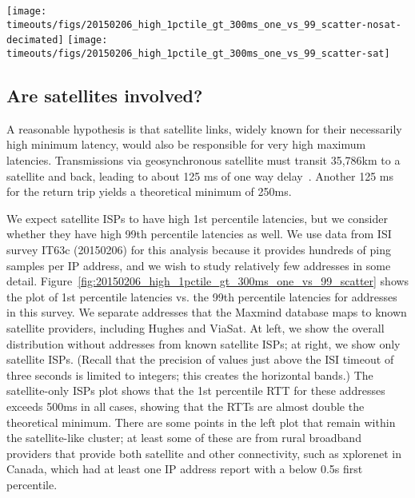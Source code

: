 \begin{figure*}
\begin{center}
\texttt{[image: timeouts/figs/20150206\_high\_1pctile\_gt\_300ms\_one\_vs\_99\_scatter-nosat-decimated]}
\hspace{0.3in}\texttt{[image: timeouts/figs/20150206\_high\_1pctile\_gt\_300ms\_one\_vs\_99\_scatter-sat]}
\end{center}
\caption[High RTTs are not solely a property of satellite-only ISPs]{\label{fig:20150206_high_1pctile_gt_300ms_one_vs_99_scatter}Scatterplot of 1st and 99th percentile latencies for addresses with high values of both in survey IT63c; Left omits satellite-only ISPs; Right includes only satellite-only ISPs.}
\end{figure*}


\subsection{Are satellites involved?}

A reasonable hypothesis is that satellite links, widely
known for their necessarily high minimum latency, would also
be responsible for very high maximum latencies.
Transmissions via
geosynchronous satellite must transit 35,786km to a
satellite and back, leading to about 125 ms of one way
delay~\cite{minei-jsac99,barakat-geostationary}.  Another 125 ms for
the return trip yields a theoretical minimum
of 250ms. 

We expect satellite ISPs to have
high 1st percentile latencies, but we consider whether they
have high 99th percentile latencies as well. We use data from ISI survey IT63c
(20150206) for this analysis because it provides hundreds of ping samples per IP address, and we wish to study relatively few addresses in some detail. Figure~\ref{fig:20150206_high_1pctile_gt_300ms_one_vs_99_scatter}
shows the plot of 1st percentile latencies vs. the 99th percentile
latencies for addresses in this survey. We
separate addresses that the Maxmind database maps to
known satellite providers, including Hughes and ViaSat.  At left, we
show the overall distribution without addresses from known satellite
ISPs; at right, we show only satellite ISPs.  (Recall that the
precision of values just above the ISI timeout of three seconds is
limited to integers; this creates the horizontal bands.)  The
satellite-only ISPs plot shows that the 1st percentile RTT for these
addresses exceeds 500ms in all cases, showing that the RTTs are almost
double the theoretical minimum. There are
some points in the left plot that remain within the satellite-like
cluster; at least some of these are from rural broadband providers
that provide both satellite and other connectivity, such as xplorenet
in Canada, which had at least one IP address report with a below 0.5s first percentile.

